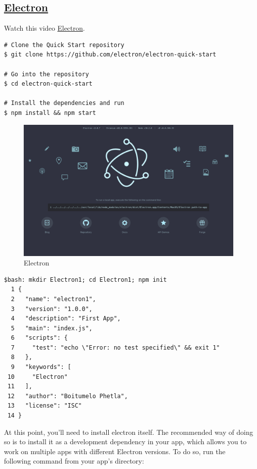 \documentclass[10pt, a4paper, twocolumn]{article}
\begin{document}
\subsection{\href{https://electronjs.org}{Electron}}

Watch this video \href{https://www.youtube.com/watch?v=8YP_nOCO-4Q&feature=youtu.be}{Electron}.

\begin{lstlisting}
# Clone the Quick Start repository
$ git clone https://github.com/electron/electron-quick-start

# Go into the repository
$ cd electron-quick-start

# Install the dependencies and run
$ npm install && npm start
\end{lstlisting}

\begin{figure}[h!]
	\includegraphics[width=\linewidth]{electron.png} %
	\caption{Electron} %
	\label{elec} %
\end{figure}

\begin{lstlisting}
$bash: mkdir Electron1; cd Electron1; npm init
  1 {
  2   "name": "electron1",
  3   "version": "1.0.0",
  4   "description": "First App",
  5   "main": "index.js",
  6   "scripts": {
  7     "test": "echo \"Error: no test specified\" && exit 1"
  8   },
  9   "keywords": [
 10     "Electron"
 11   ],
 12   "author": "Boitumelo Phetla",
 13   "license": "ISC"
 14 }
\end{lstlisting}

At this point, you'll need to install electron itself. The recommended way of doing so is to install it as a development dependency in your app, which allows you to work on multiple apps with different Electron versions. To do so, run the following command from your app's directory:
\end{document}
